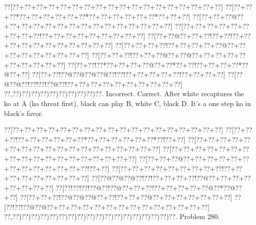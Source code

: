 \documentclass[a5paper]{article}
\begin{document}
\begin{center}
{\goo
\0??[\0??+\0??+\0??+\0??+\0??+\0??+\0??+\0??+\0??+\0??+\0??+\0??+\0??+\0??+\0??+\0??+\0??+\0??]
\0??[\0??+\0??+\0??*\0??+\0??+\0??+\0??+\0??+\0??*\0??+\0??+\0??+\0??+\0??+\0??*\0??+\0??+\0??]
\0??[\0??+\0??+\0??@\0??+\0??+\0??+\0??+\0??+\0??+\0??+\0??+\0??+\0??+\0??+\0??+\0??+\0??+\0??]
\0??[\0??+\0??+\0??+\0??+\0??+\0??+\0??+\0??+\0??!\0??+\0??+\0??+\0??+\0??+\0??+\0??+\0??+\0??]
\0??[\0??+\0??@\0??+\0??+\0??!\0??+\0??!\0??+\0??+\0??+\0??+\0??+\0??+\0??+\0??+\0??+\0??+\0??]
\0??[\0??+\0??+\0??+\0??!\0??+\0??+\0??+\0??+\0??@\0??+\0??+\0??+\0??+\0??+\0??+\0??+\0??+\0??]
\0??[\0??+\0??+\0??!\0??+\0??+\0??@\0??+\0??@\0??+\0??+\0??+\0??+\0??+\0??+\0??+\0??+\0??+\0??]
\0??[\0??+\0??!\0??*\0??+\0??+\0??+\0??@\0??+\0??*\0??+\0??!\0??+\0??+\0??+\0??*\0??@\0??+\0??]
\0??[\0??+\0??!\0??@\0??@\0??@\0??@\0??!\0??!\0??+\0??+\0??+\0??+\0??!\0??+\0??+\0??+\0??]
\0??[\0??@\0??@\0??!\0??!\0??!\0??@\0??!\0??+\0??+\0??+\0??+\0??+\0??+\0??+\0??+\0??+\0??]
\0??,\0??)\0??)\0??)\0??)\0??)\0??)\0??)\0??)\0??)\0??.
}
Incorrect. Correct. After white recaptures the ko at A (ko threat first), black can play B, white C, black D. It's a one step ko in black's favor.

\end{center}
\newpage
\begin{center}
{\goo
\0??[\0??+\0??+\0??+\0??+\0??+\0??+\0??+\0??+\0??+\0??+\0??+\0??+\0??+\0??+\0??+\0??+\0??+\0??]
\0??[\0??+\0??+\0??!\0??+\0??+\0??+\0??+\0??+\0??*\0??+\0??+\0??+\0??+\0??+\0??*\0??!\0??+\0??]
\0??[\0??+\0??+\0??+\0??+\0??+\0??+\0??+\0??+\0??+\0??+\0??+\0??+\0??+\0??+\0??+\0??+\0??+\0??]
\0??[\0??+\0??+\0??+\0??+\0??+\0??+\0??+\0??+\0??+\0??+\0??+\0??+\0??+\0??+\0??+\0??+\0??+\0??]
\0??[\0??+\0??+\0??@\0??+\0??+\0??+\0??+\0??+\0??+\0??+\0??+\0??+\0??+\0??+\0??+\0??!\0??+\0??]
\0??[\0??+\0??+\0??+\0??+\0??+\0??+\0??+\0??+\0??!\0??+\0??+\0??+\0??+\0??+\0??+\0??+\0??+\0??]
\0??[\0??@\0??@\0??@\0??!\0??!\0??+\0??+\0??+\0??!\0??@\0??+\0??+\0??+\0??+\0??+\0??+\0??+\0??]
\0??[\0??!\0??!\0??!\0??@\0??!\0??@\0??+\0??+\0??!\0??+\0??+\0??+\0??+\0??@\0??*\0??@\0??+\0??]
\0??[\0??+\0??+\0??!\0??@\0??@\0??@\0??+\0??!\0??+\0??+\0??@\0??+\0??+\0??+\0??+\0??+\0??+\0??]
\0??[\0??!\0??!\0??@\0??@\0??+\0??+\0??+\0??+\0??+\0??+\0??+\0??+\0??+\0??+\0??+\0??+\0??+\0??]
\0??,\0??)\0??)\0??)\0??)\0??)\0??)\0??)\0??)\0??)\0??)\0??)\0??)\0??)\0??)\0??)\0??)\0??)\0??.
}
Problem 280.

\end{center}
\end{document}
